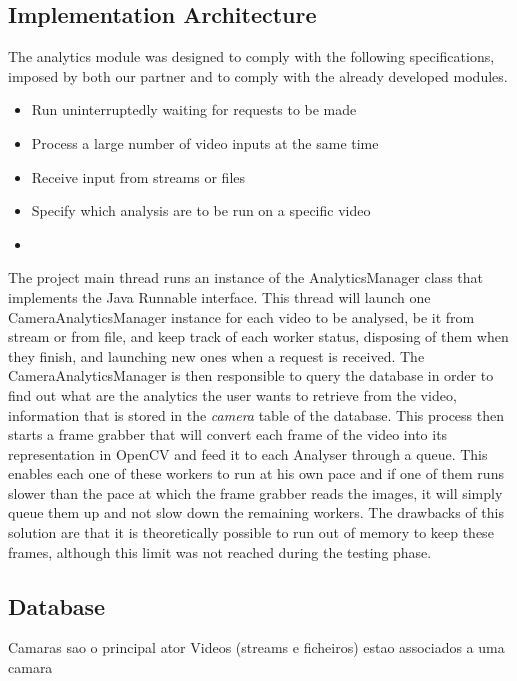 \subsection{Implementation Architecture}


The analytics module was designed to comply with the following specifications, imposed by both our partner and to comply with the already developed modules. 

\begin{itemize}
	\item Run uninterruptedly waiting for requests to be made
	\item Process a large number of video inputs at the same time
	\item Receive input from streams or files
	\item Specify which analysis are to be run on a specific video
	\item
\end{itemize}

The project main thread runs an instance of the AnalyticsManager class that implements the Java Runnable interface. This thread will launch one CameraAnalyticsManager instance for each video to be analysed, be it from stream or from file, and keep track of each worker status, disposing of them when they finish, and launching new ones when a request is received. The CameraAnalyticsManager is then responsible to query the database in order to find out what are the analytics the user wants to retrieve from the video, information that is stored in the \textit{camera} table of the database. This process then starts a frame grabber that will convert each frame of the video into its representation in OpenCV and feed it to each Analyser through a queue. This enables each one of these workers to run at his own pace and if one of them runs slower than the pace at which the frame grabber reads the images, it will simply queue them up and not slow down the remaining workers. The drawbacks of this solution are that it is theoretically possible to run out of memory to keep these frames, although this limit was not reached during the testing phase.

\subsection{Database}

Camaras sao o principal ator
Videos (streams e ficheiros) estao associados a uma camara


